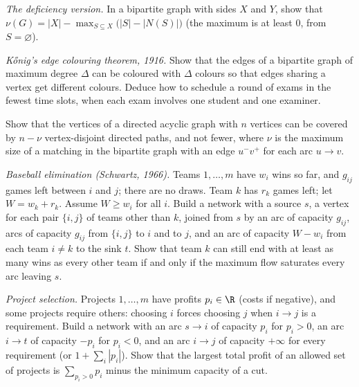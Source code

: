 \begin{exercise}[$\star\star$]\label{ex:konigore}
\emph{The deficiency version.} In a bipartite graph with sides $X$ and $Y$, show that
$\nu(G)=|X|-\max_{S\subseteq X}\bigl(|S|-|N(S)|\bigr)$ (the maximum is at least $0$, from $S=\varnothing$).
\end{exercise}

\begin{exercise}[$\star\star$]\label{ex:edgecolour}
\emph{K\H onig's edge colouring theorem, 1916.} Show that the edges of a bipartite graph of maximum degree $\Delta$ can be coloured with $\Delta$ colours so
that edges sharing a vertex get different colours. Deduce how to schedule a round of exams in the fewest time slots, when each exam involves one student
and one examiner.
\end{exercise}

\begin{exercise}[$\star$]\label{ex:pathcover}
Show that the vertices of a directed acyclic graph with $n$ vertices can be covered by $n-\nu$ vertex-disjoint directed paths, and not fewer,
where $\nu$ is the maximum size of a matching in the bipartite graph with an edge $u^-v^+$ for each arc $u\to v$.
\end{exercise}

\begin{exercise}[$\star\star$]\label{ex:baseball}
\emph{Baseball elimination (Schwartz, 1966).} Teams $1,\dots,m$ have $w_i$ wins so far, and $g_{ij}$ games left between $i$ and $j$; there are no draws. Team $k$ has $r_k$
games left; let $W=w_k+r_k$. Assume $W\ge w_i$ for all $i$. Build a network with a source $s$, a vertex for each pair $\{i,j\}$ of teams other than $k$, joined from $s$ by an arc
of capacity $g_{ij}$, arcs of capacity $g_{ij}$ from $\{i,j\}$ to $i$ and to $j$, and an arc of capacity $W-w_i$ from each team $i\ne k$ to the sink $t$. Show that team $k$ can still
end with at least as many wins as every other team if and only if the maximum flow saturates every arc leaving $s$.
\end{exercise}

\begin{exercise}[$\star\star\star$]\label{ex:closure}
\emph{Project selection.} Projects $1,\dots,m$ have profits $p_i\in\R$ (costs if negative), and some projects require others: choosing $i$
forces choosing $j$ when $i\to j$ is a requirement. Build a network with an arc $s\to i$ of capacity $p_i$ for $p_i>0$, an arc $i\to t$ of capacity
$-p_i$ for $p_i<0$, and an arc $i\to j$ of capacity $+\infty$ for every requirement (or $1+\sum_i|p_i|$). Show that the largest total profit of an
allowed set of projects is $\sum_{p_i>0}p_i$ minus the minimum capacity of a cut.
\end{exercise}

